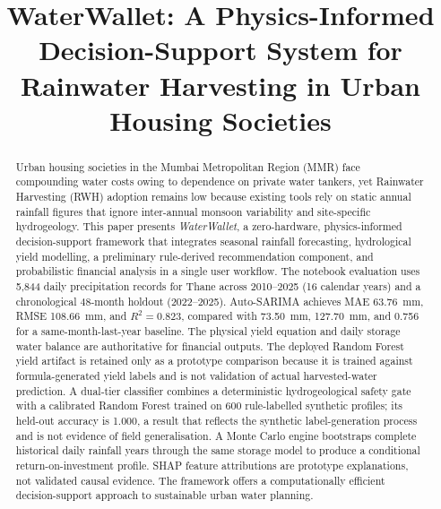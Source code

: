 ﻿\documentclass[conference]{IEEEtran}
\begin{document}
\title{WaterWallet: A Physics-Informed Decision-Support System for\\ Rainwater Harvesting in Urban Housing Societies}

\author{
}

\maketitle

\begin{abstract}
Urban housing societies in the Mumbai Metropolitan Region (MMR) face compounding water costs owing to dependence on private water tankers, yet Rainwater Harvesting (RWH) adoption remains low because existing tools rely on static annual rainfall figures that ignore inter-annual monsoon variability and site-specific hydrogeology. This paper presents \textit{WaterWallet}, a zero-hardware, physics-informed decision-support framework that integrates seasonal rainfall forecasting, hydrological yield modelling, a preliminary rule-derived recommendation component, and probabilistic financial analysis in a single user workflow. The notebook evaluation uses 5,844 daily precipitation records for Thane across 2010--2025 (16 calendar years) and a chronological 48-month holdout (2022--2025). Auto-SARIMA achieves MAE 63.76~mm, RMSE 108.66~mm, and $R^2=0.823$, compared with 73.50~mm, 127.70~mm, and 0.756 for a same-month-last-year baseline. The physical yield equation and daily storage water balance are authoritative for financial outputs. The deployed Random Forest yield artifact is retained only as a prototype comparison because it is trained against formula-generated yield labels and is not validation of actual harvested-water prediction. A dual-tier classifier combines a deterministic hydrogeological safety gate with a calibrated Random Forest trained on 600 rule-labelled synthetic profiles; its held-out accuracy is 1.000, a result that reflects the synthetic label-generation process and is not evidence of field generalisation. A Monte Carlo engine bootstraps complete historical daily rainfall years through the same storage model to produce a conditional return-on-investment profile. SHAP feature attributions are prototype explanations, not validated causal evidence. The framework offers a computationally efficient decision-support approach to sustainable urban water planning.
\end{abstract}
\end{document}
